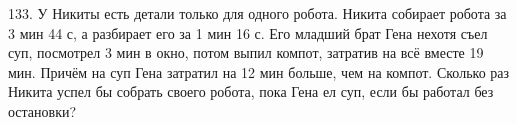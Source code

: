 133. У Никиты есть детали только для одного робота. Никита собирает робота за 3 мин 44 с, а разбирает его за 1 мин 16 с. Его младший брат Гена нехотя съел суп, посмотрел 3 мин в окно, потом выпил компот, затратив на всё вместе 19 мин. Причём на суп Гена затратил на 12 мин больше, чем на компот. Сколько раз Никита успел бы собрать своего робота, пока Гена ел суп, если бы работал без остановки?\\
